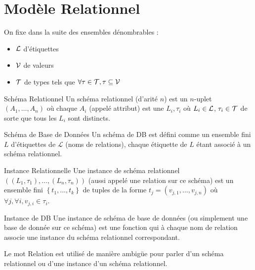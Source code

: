 \documentclass{cours}
\begin{document}
\section{Modèle Relationnel}
On fixe dans la suite des ensembles dénombrables : 
\begin{itemize}
    \item $\mathcal{L}$ d'étiquettes
    \item $\mathcal{V}$ de valeurs
    \item $\mathcal{T}$ de types tels que $\forall \tau \in \mathcal{T}, \tau \subseteq \mathcal{V}$
\end{itemize}
\begin{définition}{Schéma Relationnel}{}
    Un schéma relationnel (d'arité $n$) est un $n$-uplet $\left(A_{1}, \ldots, A_{n}\right)$ où chaque $A_{i}$ (appelé attribut) est une $L_{i}, \tau_{i}$ où $L_{i} \in \mathcal{L}$, $\tau_{i}\in \mathcal{T}$ de sorte que tous les $L_{i}$ sont distincts.
\end{définition}

\begin{définition}{Schéma de Base de Données}{}
    Un schéma de DB est défini comme un ensemble fini $L$ d'étiquettes de $\mathcal{L}$ (noms de relations), chaque étiquette de $L$ étant associé à un schéma relationnel. 
\end{définition}

\begin{définition}{Instance Relationnelle}{}
    Une instance de schéma relationnel $\left(\left(L_{1}, \tau_{1}\right), \ldots, \left(L_{n}, \tau_{n}\right)\right)$ (aussi appelé une relation sur ce schéma) est un ensemble fini $\left\{t_{1}, \ldots, t_{k}\right\}$ de tuples de la forme $t_{j} = \left(v_{j, 1}, \ldots, v_{j, n}\right)$ où $\forall j, \forall i, v_{j, i} \in \tau_{i}$.
\end{définition}

\begin{définition}{Instance de DB}{}
    Une instance de schéma de base de données (ou simplement une base de donnée sur ce schéma) est une fonction qui à chaque nom de relation associe une instance du schéma relationnel correspondant. 
\end{définition}

Le mot \og Relation \fg est utilisé de manière ambigüe pour parler d'un schéma relationnel ou d'une instance d'un schéma relationnel. 
\end{document}
